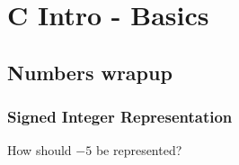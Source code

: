 \chapter{C Intro - Basics}
\section{Numbers wrapup}
\subsection{Signed Integer Representation}
How should $-5$ be represented?
